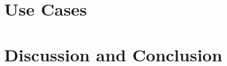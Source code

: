 \documentclass[journal]{vgtc}                %
\begin{document}

\section{Use Cases}


\section{Discussion and Conclusion}




\end{document}
